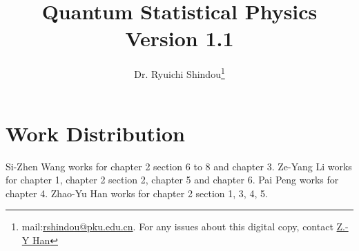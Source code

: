 \documentclass[twoside,11pt]{book}
\numberwithin{equation}{section}
\begin{document}
\title{Quantum Statistical Physics\\\normalsize Version 1.1}
\author{Dr. Ryuichi Shindou\footnote{mail:\href{mailto:rshindou@pku.edu.cn}{rshindou@pku.edu.cn}. For any issues about this digital copy, contact \href{heinsius@pku.edu.cn}{Z.-Y Han}}}
\maketitle


\tableofcontents











\newpage

\chapter*{Work Distribution}
Si-Zhen Wang works for chapter 2 section 6 to 8 and chapter 3. Ze-Yang Li works for chapter 1, chapter 2 section 2, chapter 5 and chapter 6. Pai Peng works for chapter 4. Zhao-Yu Han works for chapter 2 section 1, 3, 4, 5. 
\end{document}
